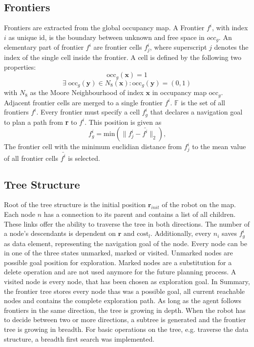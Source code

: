 \documentclass[twocolumn]{svjour3}[2016]
\begin{document}
\subsection{Frontiers}
\label{frontiers}
Frontiers are extracted from the global occupancy map. A Frontier $f^i$, with index $i$ as unique id, is the boundary between unknown and free space in $occ_g$\cite{brian_yamauchi_frontier-based_2007}. An elementary part of frontier $f^i$ are frontier cells $f^i_j$, where superscript $j$ denotes the index of the single cell inside the frontier. A cell is defined by the following two properties:
\begin{equation}
\textrm{occ}_{g}(\textbf{x}) = 1
\end{equation}
\begin{equation}
\exists\; \textrm{occ}_{g}(\textbf{y})\in N_8(\textbf{x}):\textrm{occ}_{g}(\textbf{y})=(0,1)
\end{equation}
with $N_8$ as the Moore Neighbourhood of index $\textbf{x}$ in occupancy map $\textrm{occ}_g$. Adjacent frontier cells are merged to a single frontier $f^i$. $\mathbb{F}$ is the set of all frontiers $f^i$. Every frontier must specify a cell $f^i_g$ that declares a navigation goal to plan a path from \textbf{r} to $f^i$. This position is given as
\begin{equation}
f^i_g = \textrm{min}(\|f^i_j - \bar{f^i}\|_2)\text{,}
\end{equation}
The frontier cell with the minimum euclidian distance from $f^i_j$ to the mean value of all frontier cells $\bar{f^i}$ is selected.

\subsection{Tree Structure}
Root of the tree structure is the initial position $\textbf{r}_{init}$ of the robot on the map. Each node $n$ has a connection to its parent and contains a list of all children. These links offer the ability to traverse the tree in both directions. The number of a node's descendants is dependent on $\textbf{r}\text{ and }\textrm{cost}_l$. Additionally, every $n_i$ saves $f^i_g$ as data element, representing the navigation goal of the node. Every node can be in one of the three states unmarked, marked or visited. Unmarked nodes are possible goal position for exploration. Marked nodes are a substitution for a delete operation and are not used anymore for the future planning process. A visited node is every node, that has been chosen as exploration goal. In Summary, the frontier tree stores every node thas was a possible goal, all current reachable nodes and contains the complete exploration path. As long as the agent follows frontiers in the same direction, the tree is growing in depth. When the robot has to decide between two or more directions, a subtree is generated and the frontier tree is growing in breadth.
For basic operations on the tree, e.g. traverse the data structure, a breadth first search was implemented.
\end{document}
